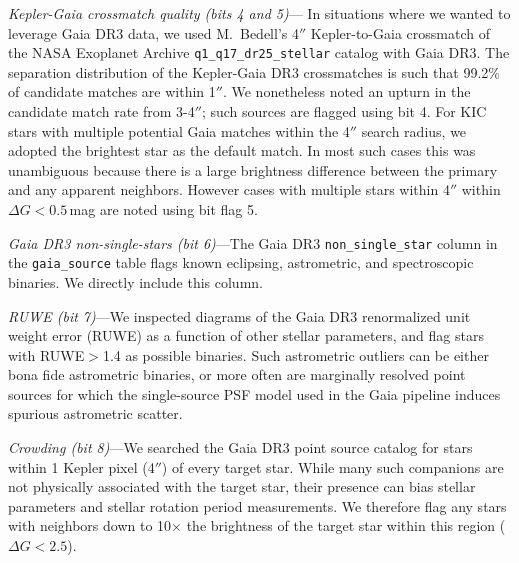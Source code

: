 \documentclass[11pt,twocolumn,tighten]{aastex63}
\begin{document}
{\it Kepler-Gaia crossmatch quality (bits 4 and 5)}--- In situations
where we wanted to leverage Gaia DR3 data, we used M.~Bedell's 4$''$
Kepler-to-Gaia crossmatch %
of the NASA Exoplanet Archive
\texttt{q1\_q17\_dr25\_stellar} catalog with Gaia DR3.  The separation
distribution of the Kepler-Gaia DR3 crossmatches is such that 99.2\%
of candidate matches are within 1$''$.   We nonetheless noted an
upturn in the candidate match rate from 3-4$''$; such sources are
flagged using bit 4.  For KIC stars with multiple potential Gaia
matches within the 4$''$ search radius, we adopted the brightest star
as the default match.  In most such cases this was unambiguous because
there is a large brightness difference between the primary and any
apparent neighbors.  However cases with multiple stars within 4$''$
within $\Delta G$$<$$0.5$\,mag are noted using bit flag 5.  

{\it Gaia DR3 non-single-stars (bit 6)}---The Gaia DR3
\texttt{non\_single\_star} column in the \texttt{gaia\_source} table
flags known eclipsing, astrometric, and spectroscopic binaries.  We
directly include this column.

{\it RUWE (bit 7)}---We inspected diagrams of the Gaia DR3 renormalized
unit weight error
(RUWE) as a function of other stellar parameters, %
and flag stars with RUWE$>$1.4 as possible binaries.  Such astrometric
outliers can be either bona fide astrometric binaries, or more often
are marginally resolved point sources for which the single-source PSF
model used in the Gaia pipeline induces spurious astrometric scatter.

{\it Crowding (bit 8)}---We searched the Gaia DR3 point source catalog
for stars within 1 Kepler pixel (4$''$) of every target star.  While
many such companions are not physically associated with the target
star, their presence can bias stellar parameters and stellar rotation
period measurements.  We therefore flag any stars with neighbors down
to 10$\times$ the brightness of the target star within this region
($\Delta G < 2.5$).
\end{document}
